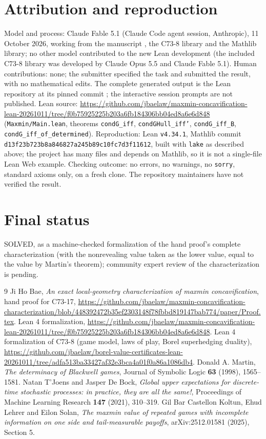 \documentclass[11pt]{article}
\theoremstyle{definition}
\begin{document}
\section*{Attribution and reproduction}
Model and process: Claude Fable 5.1 (Claude Code agent session, Anthropic), 11 October 2026, working from the manuscript \cite{Hand}, the C73-8 library \cite{Lean8} and the Mathlib library; no other model contributed to the new Lean development (the included C73-8 library was developed by Claude Opus 5.5 and Claude Fable 5.1). Human contributions: none; the submitter specified the task and submitted the result, with no mathematical edits. The complete generated output is the Lean repository at its pinned commit \cite{Lean}; the interactive session prompts are not published. Lean source: \url{https://github.com/jbaelaw/maxmin-concavification-lean-20261011/tree/f0b75925225b203a6fb184306bb04ed8a6e6d848} (\texttt{Maxmin/Main.lean}, theorems \texttt{condG\_iff}, \texttt{condGHull\_iff'}, \texttt{condG\_iff\_B}, \texttt{condG\_iff\_of\_determined}). Reproduction: Lean \texttt{v4.34.1}, Mathlib commit \texttt{d13f23b723b8a846827a245b89c10fc7d3f11612}, built with \texttt{lake} as described above; the project has many files and depends on Mathlib, so it is not a single-file Lean Web example. Checking outcome: no errors, no warnings, no \texttt{sorry}, standard axioms only, on a fresh clone. The repository maintainers have not verified the result.

\section*{Final status}
SOLVED, as a machine-checked formalization of the hand proof's complete characterization (with the nonrevealing value taken as the lower value, equal to the value by Martin's theorem); community expert review of the characterization is pending.

\begin{thebibliography}{9}
 Ji Ho Bae, \emph{An exact local-geometry characterization of maxmin concavification}, hand proof for C73-17, \url{https://github.com/jbaelaw/maxmin-concavification-characterization/blob/448392472b35ef2303148f78fbbd819147bab774/paper/Proof.tex}.
 Lean 4 formalization, \url{https://github.com/jbaelaw/maxmin-concavification-lean-20261011/tree/f0b75925225b203a6fb184306bb04ed8a6e6d848}.
 Lean 4 formalization of C73-8 (game model, laws of play, Borel superhedging duality), \url{https://github.com/jbaelaw/borel-value-certificates-lean-20261011/tree/adfa513ba33427af32e3bca4a01f0a86a1086db4}.
 Donald A. Martin, \emph{The determinacy of Blackwell games}, Journal of Symbolic Logic \textbf{63} (1998), 1565--1581.
 Natan T'Joens and Jasper De Bock, \emph{Global upper expectations for discrete-time stochastic processes: in practice, they are all the same!}, Proceedings of Machine Learning Research \textbf{147} (2021), 310--319.
 Gil Bar Castellon Koltun, Ehud Lehrer and Eilon Solan, \emph{The maxmin value of repeated games with incomplete information on one side and tail-measurable payoffs}, arXiv:2512.01581 (2025), Section 5.
\end{thebibliography}
\end{document}
